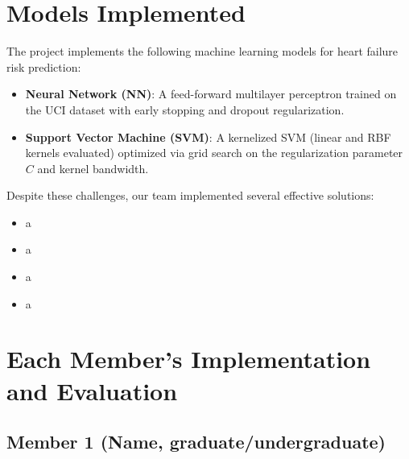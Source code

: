 \documentclass[11pt,a4paper]{article}
\begin{document}
\section{Models Implemented}
The project implements the following machine learning models for heart
failure risk prediction:
\begin{itemize}
    \vspace{-0.25cm}
    \item \textbf{Neural Network (NN)}: A feed-forward multilayer perceptron trained on the UCI dataset with early stopping and dropout regularization.
    \item \textbf{Support Vector Machine (SVM)}: A kernelized SVM (linear and RBF kernels evaluated) optimized via grid search on the regularization parameter $C$ and kernel bandwidth.
\end{itemize}


\begin{tcolorbox}[infobox={Insights and Solutions}]
    Despite these challenges, our team implemented several effective solutions:
    \vspace{-0.25cm}
    \begin{itemize}
        \item a
        \item a
        \item a
        \item a
    \end{itemize}
\end{tcolorbox}

\section{Each Member's Implementation and Evaluation}

\subsection{Member 1 (Name, graduate/undergraduate)}
\end{document}
